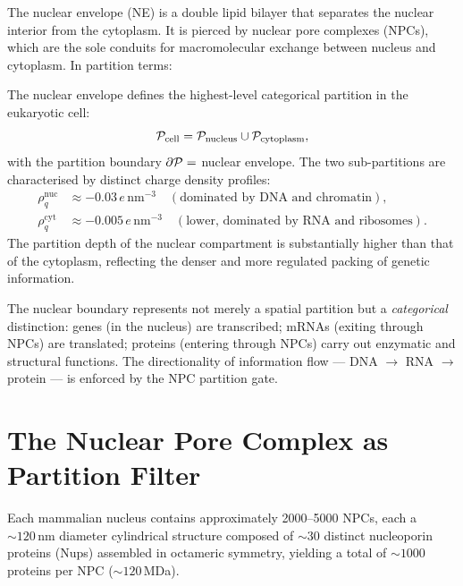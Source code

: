 The nuclear envelope (NE) is a double lipid bilayer that separates the nuclear
interior from the cytoplasm. It is pierced by nuclear pore complexes (NPCs),
which are the sole conduits for macromolecular exchange between nucleus and
cytoplasm. In partition terms:

\begin{definition}
\label{def:nc_partition}
The nuclear envelope defines the highest-level categorical partition in the
eukaryotic cell:
\begin{equation}
  \mathcal{P}_{\mathrm{cell}} = \mathcal{P}_{\mathrm{nucleus}} \cup \mathcal{P}_{\mathrm{cytoplasm}},
  \label{eq:nc_partition}
\end{equation}
with the partition boundary $\partial\mathcal{P} = $ nuclear envelope. The two
sub-partitions are characterised by distinct charge density profiles:
\begin{align}
  \rho_q^{\mathrm{nuc}} &\approx -0.03\,e\,\text{nm}^{-3}
    \quad (\text{dominated by DNA and chromatin}),\\
  \rho_q^{\mathrm{cyt}} &\approx -0.005\,e\,\text{nm}^{-3}
    \quad (\text{lower, dominated by RNA and ribosomes}).
\end{align}
The partition depth of the nuclear compartment is substantially higher than
that of the cytoplasm, reflecting the denser and more regulated packing of
genetic information.
\end{definition}

The nuclear boundary represents not merely a spatial partition but a
\emph{categorical} distinction: genes (in the nucleus) are transcribed; mRNAs
(exiting through NPCs) are translated; proteins (entering through NPCs) carry
out enzymatic and structural functions. The directionality of information
flow --- DNA $\to$ RNA $\to$ protein --- is enforced by the NPC partition gate.

\section{The Nuclear Pore Complex as Partition Filter}
\label{sec:npc_filter}

Each mammalian nucleus contains approximately 2000--5000 NPCs, each a
$\sim 120\,\text{nm}$ diameter cylindrical structure composed of $\sim 30$
distinct nucleoporin proteins (Nups) assembled in octameric symmetry, yielding
a total of $\sim 1000$ proteins per NPC ($\sim 120$\,MDa).

